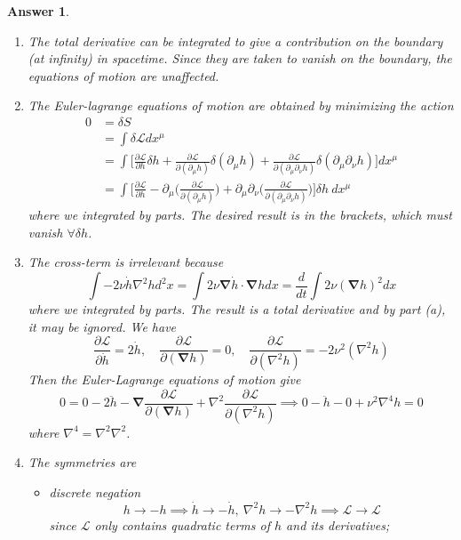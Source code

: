 \documentclass[a4paper]{article}
\newtheorem{ans}{Answer}[section]
\theoremstyle{new}
\begin{document}
\begin{ans}\leavevmode
\begin{enumerate}[label=(\alph*)]
\item The total derivative can be integrated to give a contribution on the boundary (at infinity) in spacetime. Since they are taken to vanish on the boundary, the equations of motion are unaffected.
\item The Euler-lagrange equations of motion are obtained by minimizing the action
\begin{align}
    0&=\delta S\nonumber\\&=\int\delta\mathcal{L}dx^\mu\nonumber\\&=\int\bigg[\frac{\partial\mathcal{L}}{\partial h}\delta h+\frac{\partial\mathcal{L}}{\partial(\partial_\mu h)}\delta(\partial_\mu h)+\frac{\partial\mathcal{L}}{\partial(\partial_\mu\partial_\nu h)}\delta(\partial_\mu\partial_\nu h)\bigg]dx^\mu\nonumber\\&=\int\bigg[\frac{\partial\mathcal{L}}{\partial h}-\partial_\mu\bigg(\frac{\partial\mathcal{L}}{\partial(\partial_\mu h)}\bigg)+\partial_\mu\partial_\nu\bigg(\frac{\partial\mathcal{L}}{\partial(\partial_\mu\partial_\nu h)}\bigg)\bigg]\delta h~dx^\mu\nonumber
\end{align}
where we integrated by parts. The desired result is in the brackets, which must vanish $\forall\delta h$.
\item The cross-term is irrelevant because
$$\int-2\nu\dot{h}\nabla^2h d^2x=\int 2\nu\boldsymbol{\nabla}\dot{h}\cdot\boldsymbol{\nabla}h dx=\frac{d}{dt}\int 2\nu(\boldsymbol{\nabla} h)^2dx$$
where we integrated by parts. The result is a total derivative and by part (a), it may be ignored. We have
$$\frac{\partial\mathcal{L}}{\partial\dot{h}}=2\dot{h},\quad\frac{\partial\mathcal{L}}{\partial(\boldsymbol{\nabla}h)}=0,\quad\frac{\partial\mathcal{L}}{\partial(\nabla^2h)}=-2\nu^2(\nabla^2h)$$
Then the Euler-Lagrange equations of motion give
$$0=0-2\ddot{h}-\boldsymbol{\nabla}\frac{\partial\mathcal{L}}{\partial(\boldsymbol{\nabla}h)}+\nabla^2\frac{\partial\mathcal{L}}{\partial(\nabla^2h)}\implies 0-\ddot{h}-0+\nu^2\nabla^4h=0$$
where $\nabla^4=\nabla^2\nabla^2$.
\item The symmetries are
\begin{itemize}
    \item discrete negation
    $$h\rightarrow -h\implies\dot{h}\rightarrow-\dot{h},~\nabla^2h\rightarrow-\nabla^2h\implies\mathcal{L}\rightarrow\mathcal{L}$$
    since $\mathcal{L}$ only contains quadratic terms of $h$ and its derivatives;

\end{itemize}
\end{enumerate}
\end{ans}
\end{document}

